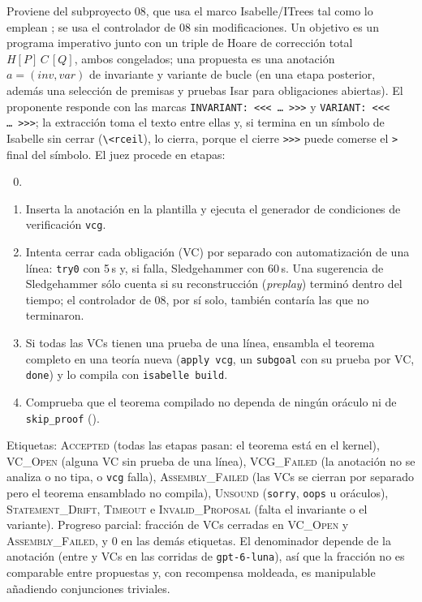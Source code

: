 \documentclass[11pt,a4paper]{article}
\theoremstyle{definition}
\theoremstyle{remark}
\newcommand{\lab}[1]{\textsc{#1}}
\newcommand{\id}[1]{\texttt{\detokenize{#1}}}
\begin{document}
Proviene del subproyecto 08, que usa el marco Isabelle/ITrees \citep{FosterHurWoodcock2024} tal como lo emplean \citet{BryantHuertaFoster2026}; se usa el controlador de 08 sin modificaciones. Un objetivo es un programa imperativo junto con un triple de Hoare de corrección total $H[P]\,C\,[Q]$, ambos congelados; una propuesta es una anotación $a = (\mathit{inv}, \mathit{var})$ de invariante y variante de bucle (en una etapa posterior, además una selección de premisas y pruebas Isar para obligaciones abiertas). El proponente responde con las marcas \texttt{INVARIANT: <{}<{}< \dots\ >{}>{}>} y \texttt{VARIANT: <{}<{}< \dots\ >{}>{}>}; la extracción toma el texto entre ellas y, si termina en un símbolo de Isabelle sin cerrar (\texttt{\textbackslash<rceil}), lo cierra, porque el cierre \texttt{>{}>{}>} puede comerse el \texttt{>} final del símbolo. El juez procede en etapas:
\begin{enumerate}
  \setcounter{enumi}{-1}
  \item \EtapaCero
  \item Inserta la anotación en la plantilla y ejecuta el generador de condiciones de verificación \texttt{vcg}.
  \item Intenta cerrar cada obligación (VC) por separado con automatización de una línea: \texttt{try0} con 5\,s y, si falla, Sledgehammer con 60\,s. Una sugerencia de Sledgehammer sólo cuenta si su reconstrucción (\emph{preplay}) terminó dentro del tiempo; el controlador de 08, por sí solo, también contaría las que no terminaron.
  \item Si todas las VCs tienen una prueba de una línea, ensambla el teorema completo en una teoría nueva (\texttt{apply vcg}, un \texttt{subgoal} con su prueba por VC, \texttt{done}) y lo compila con \texttt{isabelle build}.
  \item Comprueba que el teorema compilado no dependa de ningún oráculo ni de \texttt{skip\_proof} (\id{Thm_Deps.all_oracles}).
\end{enumerate}
Etiquetas: \lab{Accepted} (todas las etapas pasan: el teorema está en el kernel), \lab{VC\_Open} (alguna VC sin prueba de una línea), \lab{VCG\_Failed} (la anotación no se analiza o no tipa, o \texttt{vcg} falla), \lab{Assembly\_Failed} (las VCs se cierran por separado pero el teorema ensamblado no compila), \lab{Unsound} (\texttt{sorry}, \texttt{oops} u oráculos), \lab{Statement\_Drift}, \lab{Timeout} e \lab{Invalid\_Proposal} (falta el invariante o el variante). Progreso parcial: fracción de VCs cerradas en \lab{VC\_Open} y \lab{Assembly\_Failed}, y $0$ en las demás etiquetas. El denominador depende de la anotación (entre  y  VCs en las corridas de \texttt{gpt-6-luna}), así que la fracción no es comparable entre propuestas y, con recompensa moldeada, es manipulable añadiendo conjunciones triviales.
\end{document}
